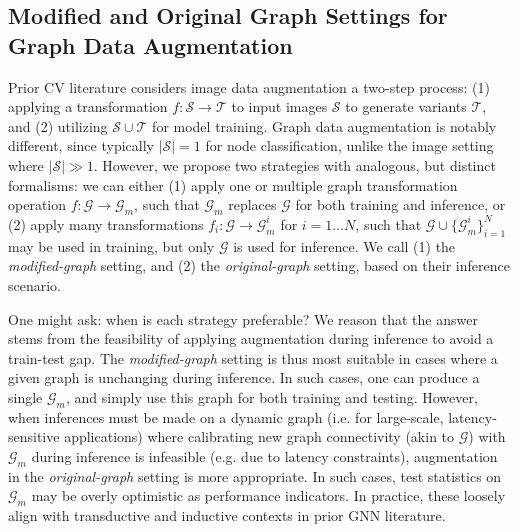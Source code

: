 \documentclass[letterpaper]{article} \usepackage{aaai21}  \usepackage{times}  \usepackage{helvet} \usepackage{courier}  \usepackage[hyphens]{url}  \usepackage{graphicx} \urlstyle{rm} \def\UrlFont{\rm}  \usepackage{natbib}  \usepackage{caption} \frenchspacing  \setlength{\pdfpagewidth}{8.5in}  \setlength{\pdfpageheight}{11in}
\begin{document}
\subsection{Modified and Original Graph Settings for Graph Data Augmentation}
\label{sec:3-3}
Prior CV literature \cite{wang2019survey}  considers image data augmentation a two-step process: (1) applying a transformation $f: \mathcal{S} \rightarrow \mathcal{T}$ to input images $\mathcal{S}$ to generate variants $\mathcal{T}$, and (2) utilizing $\mathcal{S} \cup \mathcal{T}$ for model training.  Graph data augmentation is notably different, since typically $|\mathcal{S}| = 1$  for node classification, unlike the image setting where $|\mathcal{S}| \gg 1$.  However, we propose two strategies with analogous, but distinct formalisms: we can either (1) apply one or multiple graph transformation operation $f: \mathcal{G} \rightarrow \mathcal{G}_m$, such that $\mathcal{G}_m$  replaces $\mathcal{G}$ for both training and inference, or (2) apply many transformations $f_i: \mathcal{G} \rightarrow \mathcal{G}^i_m$ for $i = 1 \ldots N$, such that $\mathcal{G} \cup \{\mathcal{G}^i_m\}_{i=1}^N$ may be used in training, but only $\mathcal{G}$ is used for inference. We call (1) the \emph{modified-graph} setting, and (2) the \emph{original-graph} setting, based on their inference scenario.

One might ask: when is each strategy preferable?   We reason that the answer stems from the feasibility of applying augmentation during inference to avoid a train-test gap.  The \emph{modified-graph} setting is thus most suitable in cases where a given graph is unchanging during inference.  In such cases, one can produce a single $\mathcal{G}_m$, and simply use this graph for both training and testing.  However, when inferences must be made on a dynamic graph (i.e. for large-scale, latency-sensitive applications) where calibrating new graph connectivity (akin to $\mathcal{G}$) with $\mathcal{G}_m$ during inference is infeasible (e.g. due to latency constraints), augmentation in the \emph{original-graph} setting is more appropriate. 
In such cases,  test statistics on $\mathcal{G}_m$ may be overly optimistic as performance indicators. 
In practice, these loosely align with transductive and inductive contexts in prior GNN literature.




 
\end{document}
